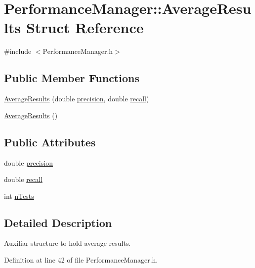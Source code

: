 \hypertarget{struct_performance_manager_1_1_average_results}{}\section{Performance\+Manager\+:\+:Average\+Results Struct Reference}
\label{struct_performance_manager_1_1_average_results}


{\ttfamily \#include $<$Performance\+Manager.\+h$>$}

\subsection*{Public Member Functions}
\begin{DoxyCompactItemize}
\item 
\hyperlink{struct_performance_manager_1_1_average_results_a55da4509ad66d3e7f75a7ca00fc5cb1c}{Average\+Results} (double \hyperlink{struct_performance_manager_1_1_average_results_a1a47d2dbd7646999a6daf9fcfb6aba81}{precision}, double \hyperlink{struct_performance_manager_1_1_average_results_ad9a5e106476b7a6d8685490ad3258c72}{recall})
\item 
\hyperlink{struct_performance_manager_1_1_average_results_ac747097a8589dbebc0d5f243daa79f0c}{Average\+Results} ()
\end{DoxyCompactItemize}
\subsection*{Public Attributes}
\begin{DoxyCompactItemize}
\item 
double \hyperlink{struct_performance_manager_1_1_average_results_a1a47d2dbd7646999a6daf9fcfb6aba81}{precision}
\item 
double \hyperlink{struct_performance_manager_1_1_average_results_ad9a5e106476b7a6d8685490ad3258c72}{recall}
\item 
int \hyperlink{struct_performance_manager_1_1_average_results_a2a5cb49ab2800a943385f0b5637ec845}{n\+Tests}
\end{DoxyCompactItemize}


\subsection{Detailed Description}
Auxiliar structure to hold average results. 

Definition at line 42 of file Performance\+Manager.\+h.



